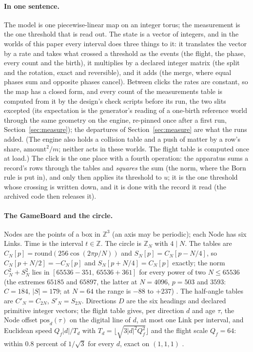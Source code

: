 \documentclass[11pt]{article}
\theoremstyle{definition}
\newcommand{\Z}{\mathbb{Z}}
\begin{document}
\paragraph{In one sentence.} The model is one piecewise-linear map on an
integer torus; the measurement is the one threshold that is read out. The
state is a vector of integers, and in the worlds of this paper every
interval does three things to it: it translates the vector by a rate and takes what
crossed a threshold as the events (the flight, the phase, every count and
the birth), it multiplies by a declared integer matrix (the split and the
rotation, exact and reversible), and it adds (the merge, where equal
phases sum and opposite phases cancel). Between clicks the rates are
constant, so the map has a closed form, and every count of the
measurements table is computed from it by the design's check scripts
before its run, the two slits excepted (its expectation is the
generator's reading of a one-birth reference world through the same
geometry on the engine, re-pinned once after a first run,
Section~\ref{sec:measure}); the departures of Section~\ref{sec:measure}
are what the runs added. (The engine also holds a collision table and a push of matter
by a row's share, $\mathrm{amount}^2/m$; neither acts in these worlds. The
flight table is computed once at load.) The click is the one place with a fourth
operation: the apparatus sums a record's rows through the tables and
\emph{squares} the sum (the norm, where the Born rule is put in), and only
then applies its threshold to $u$; it is the one threshold whose crossing
is written down, and it is done with the record it read (the archived
code then releases it).

\paragraph{The GameBoard and the circle.} Nodes are the points of a box in
$\Z^3$ (an axis may be periodic); each Node has six Links. Time is the
interval $t \in \Z$. The circle is $\Z_N$ with $4 \mid N$. The tables are
$C_N[p] = \mathrm{round}(256\cos(2\pi p/N))$ and $S_N[p] = C_N[p - N/4]$,
so $C_N[p + N/2] = -C_N[p]$ and $S_N[p + N/4] = C_N[p]$ exactly; the norm
$C_N^2 + S_N^2$ lies in $[65536 - 351,\ 65536 + 361]$ for every power of
two $N \le 65536$ (the extremes $65185$ and $65897$, the latter at
$N = 4096$, $p = 503$ and $3593$: $C = 184$, $|S| = 179$; at $N = 64$ the range is
$-88$ to $+237$) \cite{checks}. The half-angle tables are $C'_N = C_{2N}$,
$S'_N = S_{2N}$. Directions $D$ are the six headings and declared
primitive integer vectors; the flight table gives, per direction $d$ and
age $\tau$, the Node offset $\mathrm{pos}_d(\tau)$ on the digital line of
$d$, at most one Link per interval, and Euclidean speed $Q_f|d|/T_d$ with
$T_d = \lfloor\sqrt{3|d|^2Q_f^2}\rfloor$ and the flight scale $Q_f = 64$:
within $0.8$ percent of $1/\sqrt3$ for every $d$, exact on $(1,1,1)$
\cite{beamlaw}.
\end{document}
